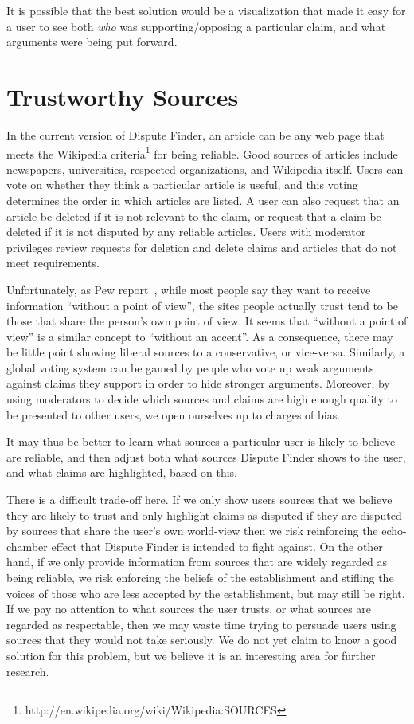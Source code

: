 \documentclass{www2010-submission}
\begin{document}
It is possible that the best solution would be a visualization that made it easy for a user to see both {\it who} was supporting/opposing a particular claim, and what arguments were being put forward.


\section{Trustworthy Sources}

In the current version of Dispute Finder, an article can be any web page that meets the Wikipedia criteria\footnote{http://en.wikipedia.org/wiki/Wikipedia:SOURCES} for being reliable. Good sources of articles include newspapers, universities, respected organizations, and Wikipedia itself. Users can vote on whether they think a particular article is useful, and this voting determines the order in which articles are listed. A user can also request that an article be deleted if it is not relevant to the claim, or request that a claim be deleted if it is not disputed by any reliable articles. Users with moderator privileges review requests for deletion and delete claims and articles that do not meet requirements.

Unfortunately, as Pew report~\cite{PewResearch2008}, while most people say they want to receive information ``without a point of view'', the sites people actually trust tend to be those that share the person's own point of view. It seems that ``without a point of view'' is a similar concept to ``without an accent''. As a consequence, there may be little point showing liberal sources to a conservative, or vice-versa. Similarly, a global voting system can be gamed by people who vote up weak arguments against claims they support in order to hide stronger arguments. Moreover, by using moderators to decide which sources and claims are high enough quality to be presented to other users, we open ourselves up to charges of bias.

It may thus be better to learn what sources a particular user is likely to believe are reliable, and then adjust both what sources Dispute Finder shows to the user, and what claims are highlighted, based on this.

There is a difficult trade-off here. If we only show users sources that we believe they are likely to trust and only highlight claims as disputed if they are disputed by sources that share the user's own world-view then we risk reinforcing the echo-chamber effect that Dispute Finder is intended to fight against. On the other hand, if we only provide information from sources that are widely regarded as being reliable, we risk enforcing the beliefs of the establishment and stifling the voices of those who are less accepted by the establishment, but may still be right. If we pay no attention to what sources the user trusts, or what sources are regarded as respectable, then we may waste time trying to persuade users using sources that they would not take seriously. We do not yet claim to know a good solution for this problem, but we believe it is an interesting area for further research.
\end{document}
